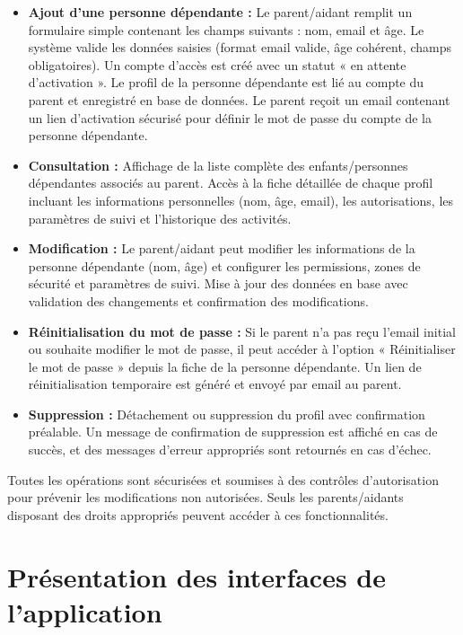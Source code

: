 \begin{itemize}
    \item \textbf{Ajout d'une personne dépendante :} Le parent/aidant remplit un formulaire simple contenant les champs suivants : nom, email et âge. Le système valide les données saisies (format email valide, âge cohérent, champs obligatoires). Un compte d'accès est créé avec un statut « en attente d'activation ». Le profil de la personne dépendante est lié au compte du parent et enregistré en base de données. Le parent reçoit un email contenant un lien d'activation sécurisé pour définir le mot de passe du compte de la personne dépendante.
    
    \item \textbf{Consultation :} Affichage de la liste complète des enfants/personnes dépendantes associés au parent. Accès à la fiche détaillée de chaque profil incluant les informations personnelles (nom, âge, email), les autorisations, les paramètres de suivi et l'historique des activités.
    
    \item \textbf{Modification :} Le parent/aidant peut modifier les informations de la personne dépendante (nom, âge) et configurer les permissions, zones de sécurité et paramètres de suivi. Mise à jour des données en base avec validation des changements et confirmation des modifications.
    
    \item \textbf{Réinitialisation du mot de passe :} Si le parent n'a pas reçu l'email initial ou souhaite modifier le mot de passe, il peut accéder à l'option « Réinitialiser le mot de passe » depuis la fiche de la personne dépendante. Un lien de réinitialisation temporaire est généré et envoyé par email au parent.
    
    \item \textbf{Suppression :} Détachement ou suppression du profil avec confirmation préalable. Un message de confirmation de suppression est affiché en cas de succès, et des messages d'erreur appropriés sont retournés en cas d'échec.
\end{itemize}

Toutes les opérations sont sécurisées et soumises à des contrôles d'autorisation pour prévenir les modifications non autorisées. Seuls les parents/aidants disposant des droits appropriés peuvent accéder à ces fonctionnalités.

\section{Présentation des interfaces de l'application}


